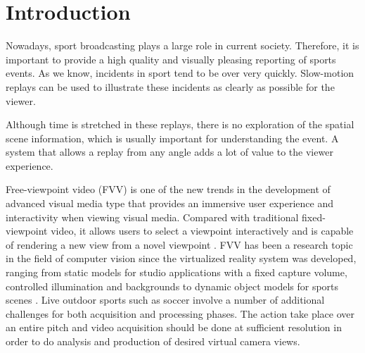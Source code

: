 \section{Introduction}
Nowadays, sport broadcasting plays a large role in current society.
Therefore, it is important to provide a high quality and visually pleasing reporting of sports events.
As we know, incidents in sport tend to be over very quickly.
Slow-motion replays can be used to illustrate these incidents as clearly as possible for the viewer. 

Although time is stretched in these replays, there is no exploration of the spatial scene information, which is usually 
important for understanding the event.
A system that allows a replay from any angle adds a lot of value to the viewer experience.



Free-viewpoint video (FVV) is one of the new trends in the development of advanced visual media type
that provides an immersive user experience and interactivity when viewing
visual media. Compared with traditional fixed-viewpoint
video, it allows users to select a viewpoint interactively and
is capable of rendering a new view from a novel viewpoint \cite{05_plane_sweeping}.
FVV has been a research topic in the field of computer vision 
since the virtualized reality system \cite{b4} was developed,
ranging from static models for studio applications with a fixed
capture volume, controlled illumination and backgrounds \cite{b5} 
to dynamic object models for sports scenes \cite{b6,b7,b8}.
Live outdoor sports such as soccer involve a number of additional challenges for both acquisition and processing phases. 
The action take place over an entire pitch and video acquisition should be done at sufficient resolution in order to
do analysis and production of desired virtual camera views.

